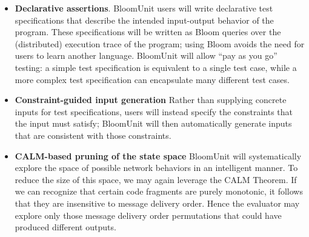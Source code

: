 \begin{itemize}
\item \textbf{Declarative assertions}.
BloomUnit users will write declarative test specifications that describe the 
intended input-output behavior of the program. These specifications will be 
written 
as Bloom queries over the (distributed) execution trace of the program; 
using Bloom avoids the need for users to learn another language. 
BloomUnit will allow ``pay as you go'' testing: a simple test specification 
is equivalent to a single test case, while a more complex test specification 
can encapsulate many different test cases.


\item \textbf{Constraint-guided input generation}
Rather than supplying concrete inputs for test specifications, users will 
instead 
specify the constraints that the input must satisfy; BloomUnit will then 
automatically generate inputs that are consistent with those constraints.

\item \textbf{CALM-based pruning of the state space}
BloomUnit will systematically explore the space of
possible network behaviors in an intelligent manner. To reduce the size of this space, we may again
leverage the CALM Theorem.
If we can recognize that certain code fragments are purely monotonic, it follows 
that they are insensitive to message delivery order.
Hence the evaluator may explore only those message delivery order permutations
that could have produced different outputs.
\end{itemize}

